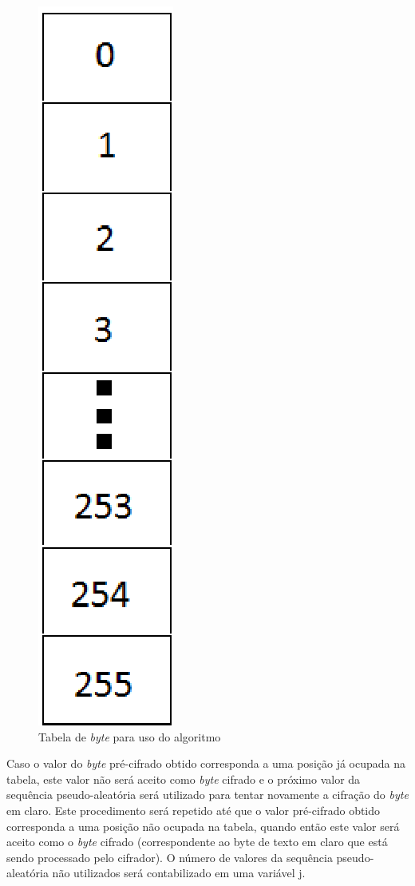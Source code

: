 \begin{figure}[h]
	\centering
	\includegraphics[scale=0.5]{figuras/tabela.eps}
	\caption{Tabela de \textit{byte} para uso do algoritmo}
\end{figure}

Caso o valor do \textit{byte} pré-cifrado obtido corresponda a uma posição já ocupada na tabela, este valor não será aceito como \textit{byte} cifrado e o próximo valor da sequência pseudo-aleatória será utilizado para tentar novamente a cifração do \textit{byte} em claro. Este procedimento será repetido até que o valor pré-cifrado obtido corresponda a uma posição não ocupada na tabela, quando então este valor será aceito como o \textit{byte} cifrado (correspondente ao byte de texto em claro que está sendo processado pelo cifrador). O número de valores da sequência pseudo-aleatória não utilizados será contabilizado em uma variável j. 

